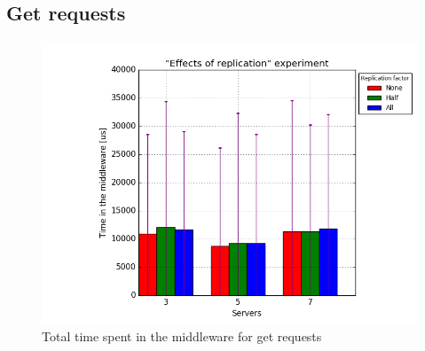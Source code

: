 \documentclass[11pt]{article}
\begin{document}
\subsection{Get requests}
\begin{figure}
\centering
	\includegraphics[width=0.7\linewidth]{plots/replication-get}

\caption{Total time spent in the middleware for get requests}
\label{fig:replication-get}
\end{figure}
\end{document}
